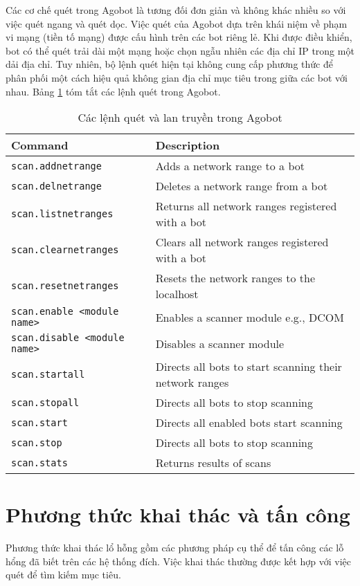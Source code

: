 Các cơ chế quét trong Agobot là tương đối đơn giản và không khác nhiều so với việc quét ngang và quét dọc.
Việc quét của Agobot dựa trên khái niệm về phạm vi mạng (tiền tố mạng) được cấu hình trên các bot riêng lẻ.
Khi được điều khiển, bot có thể quét trải dài một mạng hoặc chọn ngẫu nhiên các địa chỉ IP trong một dải địa chỉ.
Tuy nhiên, bộ lệnh quét hiện tại không cung cấp phương thức để phân phối một cách hiệu quả không gian địa chỉ mục tiêu trong giữa các bot với nhau. Bảng \ref{table:botprog} tóm tắt các lệnh quét trong Agobot.

\begin{table}[ht!]
	\caption{Các lệnh quét và lan truyền trong Agobot}
	\label{table:botprog}
	\centering
	\footnotesize
	\begin{tabular}{l l}
		\toprule
		\textbf{Command} &
		\textbf{Description} \\
		\midrule
		\texttt{scan.addnetrange} & Adds a network range to a bot\\
		\texttt{scan.delnetrange} & Deletes a network range from a bot\\
		\texttt{scan.listnetranges} & Returns all network ranges registered with a bot\\
		\texttt{scan.clearnetranges} & Clears all network ranges registered with a bot\\
		\texttt{scan.resetnetranges} & Resets the network ranges to the localhost\\
		\texttt{scan.enable <module name>} & Enables a scanner module e.g., DCOM\\
		\texttt{scan.disable <module name>} & Disables a scanner module\\
		\texttt{scan.startall} & Directs all bots to start scanning their network ranges\\
		\texttt{scan.stopall} & Directs all bots to stop scanning\\
		\texttt{scan.start} & Directs all enabled bots start scanning\\
		\texttt{scan.stop} & Directs all bots to stop scanning\\
		\texttt{scan.stats} & Returns results of scans\\
		\bottomrule
	\end{tabular}
\end{table}

\section{Phương thức khai thác và tấn công}
Phương thức khai thác lổ hỗng gồm các phương pháp cụ thể để tấn công các lỗ hổng đã biết trên các hệ thống đích.
Việc khai thác thường được kết hợp với việc quét để tìm kiếm mục tiêu.

